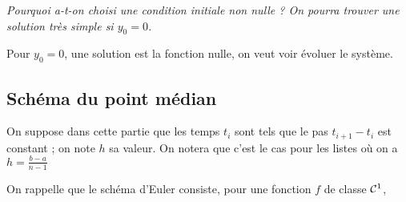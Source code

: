 \begin{Exercise}\it
Pourquoi a-t-on choisi une condition initiale non nulle ? On pourra trouver une solution très simple si $y_0=0$. 
\end{Exercise}
\begin{Answer}Pour $y_0=0$, une solution est la fonction nulle, on veut voir évoluer le système.
\end{Answer}
\subsection{Schéma du point médian} 
On suppose dans cette partie que les temps $t_i$ sont tels que le pas $t_{i+1} - t_i$ est constant ; on note $h$ sa valeur. On notera que c'est le cas pour les listes  où on a $h = \frac{b-a}{n-1}$


On rappelle que le schéma d'Euler consiste, pour une fonction $f$ de classe ${\cal C}^1$, 

